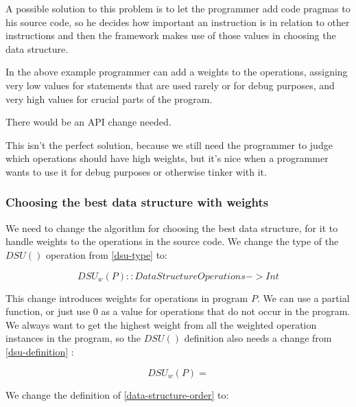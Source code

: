 \documentclass[11pt]{article}
\begin{document}
			A possible solution to this problem is to let the programmer add code pragmas to his source
			code, so he decides how important an instruction is in relation to other instructions and then
			the framework makes use of those values in choosing the data structure.

			

			In the above example programmer can add a weights to the operations, assigning very low values
			for statements that are used rarely or for debug purposes, and very high values for crucial
			parts of the program.

			There would be an API change needed.

			

			This isn't the perfect solution, because we still need the programmer to judge which operations
			should have high weights, but it's nice when a programmer wants to use it for debug purposes or
			otherwise tinker with it.

		\subsubsection{Choosing the best data structure with weights}

			We need to change the algorithm for choosing the best data structure, for it to handle weights
			to the operations in the source code. We change the type of the $DSU()$ operation from
			\ref{dsu-type} to:

			\begin{equation}
				DSU_w(P) :: DataStructureOperations -> Int
			\end{equation}

			This change introduces weights for operations in program $P$. We can use a partial function, or
			just use $0$ as a value for operations that do not occur in the program. We always want to get
			the highest weight from all the weighted operation instances in the program, so the $DSU()$
			definition also needs a change from \ref{dsu-definition} :

			\begin{equation}
				DSU_w(P) =
			\end{equation}

			We change the definition of \autoref{data-structure-order} to:

			\begin{equation}
			\end{equation}
\end{document}
